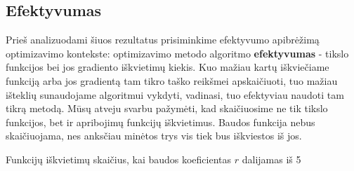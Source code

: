 \documentclass{article}
\begin{document}
\subsection{Efektyvumas}
Prieš analizuodami šiuos rezultatus prisiminkime efektyvumo apibrėžimą optimizavimo kontekste: optimizavimo metodo algoritmo \textbf{efektyvumas} - tikslo funkcijos bei jos gradiento iškvietimų kiekis. Kuo mažiau kartų iškviečiame funkciją arba jos gradientą tam tikro taško reikšmei apskaičiuoti, tuo mažiau išteklių sunaudojame algoritmui vykdyti, vadinasi, tuo efektyviau naudoti tam tikrą metodą. Mūsų atveju svarbu pažymėti, kad skaičiuosime ne tik tikslo funkcijos, bet ir apribojimų funkcijų iškvietimus. Baudos funkcija nebus skaičiuojama, nes anksčiau minėtos trys vis tiek bus iškviestos iš jos.

\begin{table}[H]
    \centering
    \caption{Funkcijų iškvietimų skaičius, kai baudos koeficientas $r$ dalijamas iš 5}
    \label{table:10}
\end{table}
\end{document}
